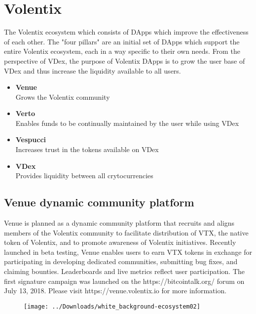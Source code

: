 \documentclass[]{article}
\begin{document}
{ 	

\section{Volentix}	
The Volentix ecosystem which consists of DApps which improve the effectiveness of each other.
The "four pillars" are an initial set of DApps which support the entire Volentix ecosystem,
each in a way specific to their own needs.
From the perspective of VDex, the purpose of Volentix DApps is to grow the user base of VDex
and thus increase the liquidity available to all users.\\
\begin{itemize}
\item \textbf{Venue}\\ Grows the Volentix community
\item \textbf{Verto}\\ Enables funds to be continually maintained by the user while using VDex
\item \textbf{Vespucci}\\ Increases trust in the tokens available on VDex
\item \textbf{VDex}\\ Provides liquidity between all crytocurrencies
\end{itemize}

\subsection {Venue dynamic community platform}

Venue is planned as a dynamic community platform that recruits and aligns members of the Volentix community to facilitate distribution of VTX, the native token of Volentix, and to promote awareness of Volentix initiatives. 
Recently launched in beta testing, Venue enables users to earn VTX tokens in exchange for participating in developing dedicated communities, submitting bug fixes, and claiming bounties. Leaderboards and live metrics reflect user participation. The first signature campaign was launched on the https://bitcointalk.org/ forum on July 13, 2018. Please visit https://venue.volentix.io for more information.

	
\begin{figure}
	\centering
	\texttt{[image: ../Downloads/white\_background-ecosystem02]}
	\caption{}
	\label{fig:whitebackground-ecosystem02}
\end{figure}



}
\end{document}
